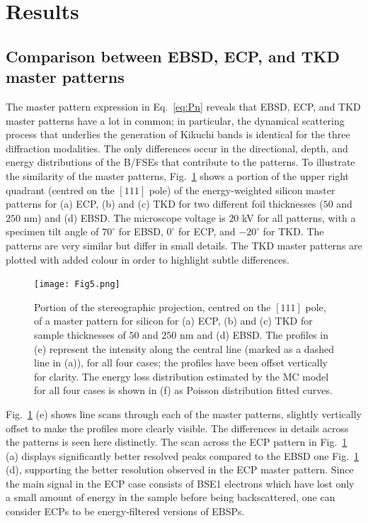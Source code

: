 \section{Results}
\subsection{Comparison between EBSD, ECP, and TKD master patterns}
\label{sec:comparison}
The master pattern expression in Eq.~\ref{eq:Pn} reveals that EBSD, ECP, and TKD master patterns have a lot in common; in particular, the dynamical scattering process that underlies the generation of Kikuchi bands is identical for the three diffraction modalities. The only differences occur in the directional, depth, and energy distributions of the B/FSEs that contribute to the patterns.  To illustrate the similarity of the master patterns, Fig.~\ref{fig:MPs} shows a portion of the upper right quadrant (centred on the $[111]$ pole) of the energy-weighted silicon master patterns for (a) ECP, (b) and (c) TKD for two different foil thicknesses ($50$ and $250$ nm) and (d) EBSD. The  microscope voltage is $20$ kV for all patterns, with a specimen tilt angle of $70^{\circ}$ for EBSD, $0^{\circ}$ for ECP, and $-20^{\circ}$ for TKD.  The patterns are very similar but differ in small details. The TKD master patterns are plotted with added colour in order to highlight  subtle differences.

\begin{figure}[ht]
\centering
\texttt{[image: Fig5.png]}%
\caption[(a) ECP, (b) and  (c) TKD for sample thicknesses of $50$ and $250$ nm and (d) EBSD]{Portion of the stereographic projection, centred on the $[111]$ pole, of a master pattern for silicon for (a) ECP, (b) and  (c) TKD for sample thicknesses of $50$ and $250$ nm and (d) EBSD. The profiles in (e) represent the intensity along the central line (marked as a dashed line in (a)), for all four cases; the profiles have been offset vertically for clarity. The energy loss distribution estimated by the MC model for all four cases is shown in (f) as Poisson distribution fitted curves. }
\label{fig:MPs}
\end{figure}

Fig.~\ref{fig:MPs} (e) shows line scans through each of the master patterns, slightly vertically offset to make the profiles more clearly visible. The differences in details across the patterns is seen here distinctly. The scan across the ECP pattern in Fig.~\ref{fig:MPs} (a) displays significantly better resolved peaks compared to the EBSD one Fig.~\ref{fig:MPs} (d), supporting the better resolution observed in the ECP master pattern. Since the main signal in the ECP case consists of BSE1 electrons which have lost only a small amount of energy in the sample before being backscattered, one can consider ECPs to be energy-filtered versions of EBSPs. 


